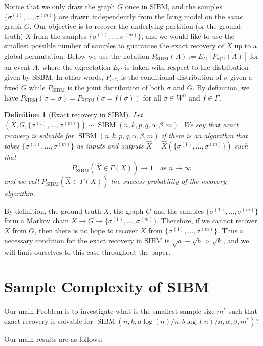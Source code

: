\label{key}\documentclass[conference]{IEEEtran}
\newtheorem{definition}{Definition}%
\DeclareMathOperator{\SIBM}{SIBM}
\begin{document}
Notice that we only draw the graph $G$ once in SIBM, and the samples $\{\sigma^{(1)},\dots,\sigma^{(m)}\}$ are drawn independently from the Ising model on the {\em same} graph $G$.
Our objective is to recover the underlying partition (or the ground truth) $X$ from the samples $\{\sigma^{(1)},\dots,\sigma^{(m)}\}$, and we would like to use the smallest possible number of samples to guarantee the exact recovery of $X$ up to a global permutation.
Below we use the notation $P_{\SIBM}(A):=E_G[P_{\sigma|G}(A)]$ for an event $A$, where the expectation $E_G$ is taken with respect to the distribution given by SSBM. In other words, $P_{\sigma|G}$ is the conditional distribution of  $\sigma$ given a fixed $G$ while $P_{\SIBM}$ is the joint distribution of both $\sigma$ and $G$.
By definition, we have $P_{\SIBM}(\sigma=\bar{\sigma})=P_{\SIBM}(\sigma=f(\bar{\sigma}))$ for all $\bar{\sigma}\in W^n$ and $f\in \Gamma$.


\begin{definition}[Exact recovery in SIBM]
Let $(X,G,\{\sigma^{(1)},\dots,\sigma^{(m)}\}) \sim \SIBM(n,k,p,q,\alpha,\beta,m)$.
We say that exact recovery is solvable for $\SIBM(n,k,p,q,\alpha,\beta,m)$ if there is an algorithm that takes $\{\sigma^{(1)},\dots,\sigma^{(m)}\}$ as inputs and outputs $\hat{X}=\hat{X}(\{\sigma^{(1)},\dots,\sigma^{(m)}\})$ such that
$$
P_{\SIBM}(\hat{X} \in \Gamma(X)) \to 1
\text{~~~as~} n\to\infty
$$
and we call $P_{\SIBM}(\hat{X} \in \Gamma(X))$ the success probability of the recovery algorithm.
\end{definition}

By definition, the ground truth $X$, the graph $G$ and the samples $\{\sigma^{(1)},\dots,\sigma^{(m)}\}$ form a Markov chain $X\to G\to \{\sigma^{(1)},\dots,\sigma^{(m)}\}$. Therefore, if we cannot recover $X$ from $G$, then there is no hope to recover $X$ from $\{\sigma^{(1)},\dots,\sigma^{(m)}\}$. Thus a necessary condition for the exact recovery in SIBM is $\sqrt{a}-\sqrt{b}> \sqrt{k}$, and we will limit ourselves to this case throughout the paper.

\section{Sample Complexity of SIBM}\label{s:trans}
Our main Problem is to investigate what is the smallest sample size $m^\ast$ such that exact recovery is solvable for $\SIBM(n,k, a\log(n)/n, b\log(n)/n,\alpha,\beta,m^\ast)$?

Our main results are as follows:
\end{document}
